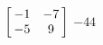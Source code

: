 {$\left[\hskip -3pt \begin{array}{cc} -1&-7\\  -5&9\end {array} \hskip -3pt
 \right] $} 
{$-44$}



  

